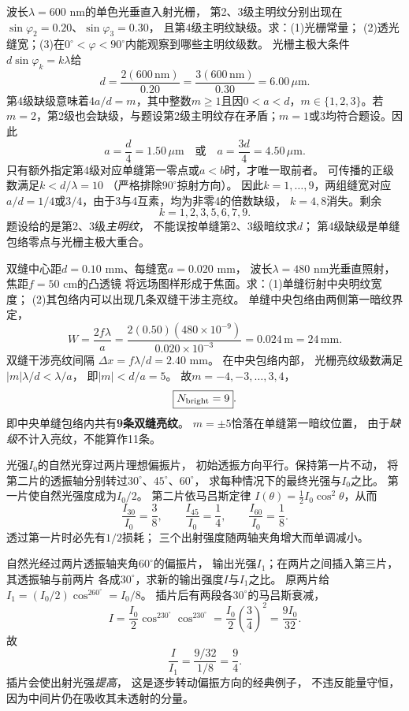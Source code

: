 \problemtext 波长$\lambda=600$ nm的单色光垂直入射光栅，
第2、3级主明纹分别出现在
$\sin\varphi_2=0.20$、$\sin\varphi_3=0.30$，
且第4级主明纹缺级。求：(1)光栅常量；
(2)透光缝宽；(3)在$0^\circ<\varphi<90^\circ$内能观察到哪些主明纹级数。
\workings
光栅主极大条件
$d\sin\varphi_k=k\lambda$给
\[
\boxed{d=\frac{2(600\,\mathrm{nm})}{0.20}
=\frac{3(600\,\mathrm{nm})}{0.30}=6.00\,\mu\mathrm m}.
\]
第4级缺级意味着$4a/d=m$，其中整数$m\ge1$且因$0<a<d$，$m\in\{1,2,3\}$。若$m=2$，第2级也会缺级，与题设第2级主明纹存在矛盾；$m=1$或$3$均符合题设。因此
\[
\boxed{a=\frac d4=1.50\,\mu\mathrm m\quad\text{或}\quad a=\frac{3d}4=4.50\,\mu\mathrm m}.
\]
只有额外指定第4级对应单缝第一零点或$a<b$时，才唯一取前者。
可传播的正级数满足$k<d/\lambda=10$
（严格排除$90^\circ$掠射方向）。
因此$k=1,\ldots,9$，两组缝宽对应$a/d=1/4$或$3/4$，由于3与4互素，均为非零4的倍数缺级，
$k=4,8$消失。剩余
\[
\boxed{k=1,2,3,5,6,7,9}.
\]
\crosscheck 题设给的是第2、3级\emph{主明纹}，
不能误按单缝第2、3级暗纹求$d$；
第4级缺级是单缝包络零点与光栅主极大重合。

\problemtext 双缝中心距$d=0.10$ mm、每缝宽$a=0.020$ mm，
波长$\lambda=480$ nm光垂直照射，焦距$f=50$ cm的凸透镜
将远场图样形成于焦面。求：(1)单缝衍射中央明纹宽度；
(2)其包络内可以出现几条双缝干涉主亮纹。
\workings
单缝中央包络由两侧第一暗纹界定，
\[
\boxed{W=\frac{2f\lambda}{a}
=\frac{2(0.50)(480\times10^{-9})}
{0.020\times10^{-3}}
=0.024\,\mathrm m=24\,\mathrm{mm}}.
\]
双缝干涉亮纹间隔
$\Delta x=f\lambda/d=2.40$ mm。
在中央包络内部，
光栅亮纹级数满足
$|m|\lambda/d<\lambda/a$，
即$|m|<d/a=5$。
故$m=-4,-3,\ldots,3,4$，
\[
\boxed{N_{\rm bright}=9}.
\]
即中央单缝包络内共有\textbf{9条双缝亮纹}。
\crosscheck $m=\pm5$恰落在单缝第一暗纹位置，
由于\emph{缺级}不计入亮纹，不能算作11条。

\problemtext 光强$I_0$的自然光穿过两片理想偏振片，
初始透振方向平行。保持第一片不动，
将第二片的透振轴分别转过$30^\circ$、$45^\circ$、$60^\circ$，
求每种情况下的最终光强与$I_0$之比。
\workings
第一片使自然光强度成为$I_0/2$。
第二片依马吕斯定律
$I(\theta)=\tfrac12I_0\cos^2\theta$，从而
\[
\boxed{\frac{I_{30}}{I_0}=\frac38},\qquad
\boxed{\frac{I_{45}}{I_0}=\frac14},\qquad
\boxed{\frac{I_{60}}{I_0}=\frac18}.
\]
\crosscheck 透过第一片时必先有$1/2$损耗；
三个出射强度随两轴夹角增大而单调减小。

\problemtext 自然光经过两片透振轴夹角$60^\circ$的偏振片，
输出光强$I_1$；在两片之间插入第三片，其透振轴与前两片
各成$30^\circ$，求新的输出强度$I$与$I_1$之比。
\workings
原两片给
$I_1=(I_0/2)\cos^260^\circ=I_0/8$。
插片后有两段各$30^\circ$的马吕斯衰减，
\[
I=\frac{I_0}{2}\cos^230^\circ\cos^230^\circ
=\frac{I_0}{2}\left(\frac34\right)^2
=\frac{9I_0}{32}.
\]
故
\[
\boxed{\frac I{I_1}=\frac{9/32}{1/8}=\frac94}.
\]
\crosscheck 插片会使出射光强\emph{提高}，
这是逐步转动偏振方向的经典例子，
不违反能量守恒，因为中间片仍在吸收其未透射的分量。

